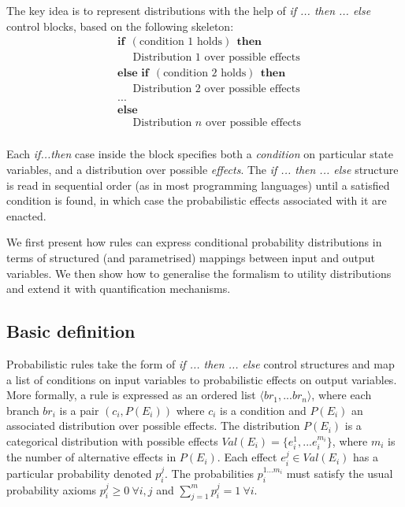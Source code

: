 The key idea is to represent distributions with the help of \textit{if ... then ... else} control blocks, based on the following skeleton:
\begin{equation*}
\begin{aligned}
& \textbf{if} \ \ (\text{condition 1 holds}) \ \ \textbf{then} \\ 
& \;\;\;\;\; \text{Distribution 1 over possible effects} \\
& \textbf{else if} \ \ (\text{condition 2 holds}) \ \ \textbf{then} \\ 
& \;\;\;\;\; \text{Distribution 2 over possible effects} \\
& ... \\
& \textbf{else} \\
& \;\;\;\;\; \text{Distribution } n \text{ over possible effects} \\ 
\end{aligned}
\label{eq:probrule}
\end{equation*}

Each \textit{if...then} case inside the block specifies both a \textit{condition} on particular state variables, and a distribution over possible \textit{effects}.   The \textit{if ... then ... else} structure is read in sequential order (as in most programming languages) until a satisfied condition is found, in which case the probabilistic effects associated with it are enacted.

We first present how rules can express conditional probability distributions in terms of structured (and parametrised) mappings between input and output variables.  We then show how to  generalise the formalism to utility distributions and extend it with quantification mechanisms.

\subsection{Basic definition}

Probabilistic rules take the form of \textit{if ... then ... else} control structures and map a list of conditions on input variables to probabilistic effects on output variables. More formally, a rule is expressed as an ordered list $\langle br_1, ... br_n\rangle$, where each branch $br_i$ is a pair $(c_i, P(E_i))$ where $c_i$ is a condition and $P(E_i)$ an associated distribution over possible effects.  The distribution $P(E_i)$ is a categorical distribution with possible effects $Val(E_i) = \{e_i^1,... e_i^{m_i}\}$, where $m_i$ is the number of alternative effects in $P(E_i)$.  Each effect $e_i^j \in Val(E_i)$ has a particular probability denoted $p_i^j$.  The probabilities $p_i^{1...m_i}$ must satisfy the usual probability axioms $p_i^j \geq 0 \ \forall i,j$ and $\sum_{j = 1}^m p_i^j = 1 \ \forall i$. 

